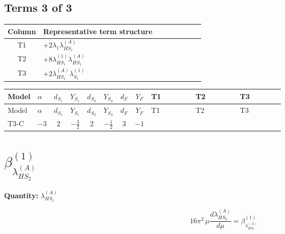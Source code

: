 \documentclass[8pt]{article}
\begin{document}
\begin{landscape}
\subsection*{Terms 3 of 3}
\begin{center}
\begin{tabular}{@{}c >{\raggedright\arraybackslash}p{0.82\linewidth}@{}}
\toprule
Column & Representative term structure \\
\midrule
T1 & \(\displaystyle +2 {\lambda_1} {\lambda_{HS_1}^{(A)}}\) \\
\midrule
T2 & \(\displaystyle +8 {\lambda_{HS_1}^{(1)}} {\lambda_{HS_1}^{(A)}}\) \\
\midrule
T3 & \(\displaystyle +2 {\lambda_{HS_1}^{(A)}} {\lambda_{S_1}^{(1)}}\) \\
\midrule
\bottomrule
\end{tabular}
\end{center}
\smallskip
\tiny
\begin{longtable}{@{}llcccccc >{\raggedright\arraybackslash}p{0.21\linewidth} >{\raggedright\arraybackslash}p{0.21\linewidth} >{\raggedright\arraybackslash}p{0.21\linewidth}@{}}
\toprule
Model & $\alpha$ & $d_{S_1}$ & $Y_{S_1}$ & $d_{S_2}$ & $Y_{S_2}$ & $d_F$ & $Y_F$ & T1 & T2 & T3 \\
\midrule
\endfirsthead
\toprule
Model & $\alpha$ & $d_{S_1}$ & $Y_{S_1}$ & $d_{S_2}$ & $Y_{S_2}$ & $d_F$ & $Y_F$ & T1 & T2 & T3 \\
\midrule
\endhead
T3-C & $-3$ & $2$ & $-\frac{3}{2}$ & $2$ & $-\frac{1}{2}$ & $3$ & $-1$ & \scriptsize\adjustbox{max width=\linewidth}{$\begin{gathered} +2 {\lambda_1} {\lambda_{HS_1}^{(A)}}\end{gathered}$} & \scriptsize\adjustbox{max width=\linewidth}{$\begin{gathered} +8 {\lambda_{HS_1}^{(1)}} {\lambda_{HS_1}^{(A)}}\end{gathered}$} & \scriptsize\adjustbox{max width=\linewidth}{$\begin{gathered} +2 {\lambda_{HS_1}^{(A)}} {\lambda_{S_1}^{(1)}}\end{gathered}$} \\
\midrule
\bottomrule
\end{longtable}
\clearpage
\section*{$\beta_{\lambda_{HS_2}^{(A)}}^{(1)}$}
\noindent\textbf{Quantity: }$\lambda_{HS_2}^{(A)}$\par\smallskip
\[16\pi^2\,\mu\frac{d \lambda_{HS_2}^{(A)}}{d\mu}=\beta_{\lambda_{HS_2}^{(A)}}^{(1)}\]

\end{landscape}
\end{document}
